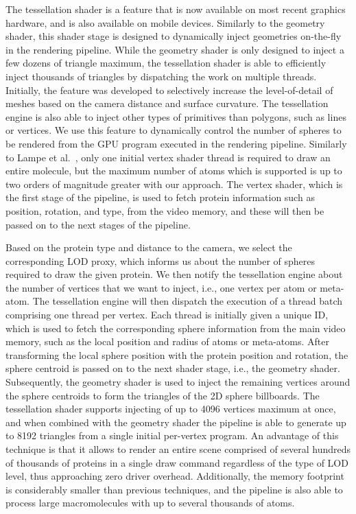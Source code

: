 The tessellation shader is a feature that is now available on most recent graphics hardware, and is also available on mobile devices.
Similarly to the geometry shader, this shader stage is designed to dynamically inject geometries on-the-fly in the rendering pipeline.
While the geometry shader is only designed to inject a few dozens of triangle maximum, the tessellation shader is able to efficiently inject thousands of triangles by dispatching the work on multiple threads.
Initially, the feature was developed to selectively increase the level-of-detail of meshes based on the camera distance and surface curvature.
The tessellation engine is also able to inject other types of primitives than polygons, such as lines or vertices.
We use this feature to dynamically control the number of spheres to be rendered from the GPU program executed in the rendering pipeline.
Similarly to Lampe et al.~\cite{lampe2007two}, only one initial vertex shader thread is required to draw an entire molecule, but the maximum number of atoms which is supported is up to two orders of magnitude greater with our approach.
The vertex shader, which is the first stage of the pipeline, is used to fetch protein information such as position, rotation, and type, from the video memory, and these will then be passed on to the next stages of the pipeline.

Based on the protein type and distance to the camera, we select the corresponding LOD proxy, which informs us about the number of spheres required to draw the given protein.
We then notify the tessellation engine about the number of vertices that we want to inject, i.e., one vertex per atom or meta-atom.
The tessellation engine will then dispatch the execution of a thread batch comprising one thread per vertex.
Each thread is initially given a unique ID, which is used to fetch the corresponding sphere information from the main video memory, such as the local position and radius of atoms or meta-atoms.
After transforming the local sphere position with the protein position and rotation, the sphere centroid is passed on to the next shader stage, i.e., the geometry shader.
Subsequently, the geometry shader is used to inject the remaining vertices around the sphere centroids to form the triangles of the 2D sphere billboards.
The tessellation shader supports injecting of up to 4096 vertices maximum at once, and when combined with the geometry shader the pipeline is able to generate up to 8192 triangles from a single initial per-vertex program.
An advantage of this technique is that it allows to render an entire scene comprised of several hundreds of thousands of proteins in a single draw command regardless of the type of LOD level, thus approaching zero driver overhead.
Additionally, the memory footprint is considerably smaller than previous techniques, and the pipeline is also able to process large macromolecules with up to several thousands of atoms.

